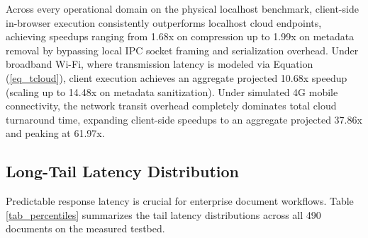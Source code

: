 \documentclass[journal]{IEEEtran}
\begin{document}
Across every operational domain on the physical localhost benchmark, client-side in-browser execution consistently outperforms localhost cloud endpoints, achieving speedups ranging from 1.68x on compression up to 1.99x on metadata removal by bypassing local IPC socket framing and serialization overhead. Under broadband Wi-Fi, where transmission latency is modeled via Equation (\ref{eq_tcloud}), client execution achieves an aggregate projected 10.68x speedup (scaling up to 14.48x on metadata sanitization). Under simulated 4G mobile connectivity, the network transit overhead completely dominates total cloud turnaround time, expanding client-side speedups to an aggregate projected 37.86x and peaking at 61.97x.

\begin{table}[!t]
\centering
\caption{Long-Tail Latency Percentiles (Milliseconds)}
\label{tab_percentiles}
\end{table}

\subsection{Long-Tail Latency Distribution}
Predictable response latency is crucial for enterprise document workflows. Table \ref{tab_percentiles} summarizes the tail latency distributions across all 490 documents on the measured testbed.
\end{document}
